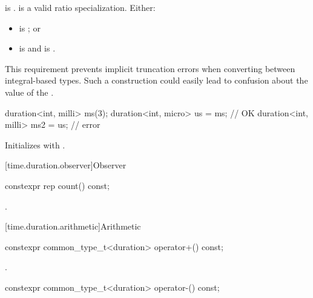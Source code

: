 \begin{itemdescr}
\pnum
\constraints
{} is .
 is a valid ratio specialization.
Either:
\begin{itemize}
\item {} is ; or
\item {} is  and
 is .
\end{itemize}
\begin{note}
This
requirement prevents implicit truncation errors when converting between
integral-based  types. Such a construction could easily lead to
confusion about the value of the .
\end{note}
\begin{example}
\begin{codeblock}
duration<int, milli> ms(3);
duration<int, micro> us = ms;       // OK
duration<int, milli> ms2 = us;      // error
\end{codeblock}
\end{example}

\pnum
\effects
Initializes  with .
\end{itemdescr}

[time.duration.observer]{Observer}

%
\begin{itemdecl}
constexpr rep count() const;
\end{itemdecl}

\begin{itemdescr}
\pnum
\returns
{}.
\end{itemdescr}

[time.duration.arithmetic]{Arithmetic}

%
\begin{itemdecl}
constexpr common_type_t<duration> operator+() const;
\end{itemdecl}

\begin{itemdescr}
\pnum
\returns
{}.
\end{itemdescr}

%
\begin{itemdecl}
constexpr common_type_t<duration> operator-() const;
\end{itemdecl}

